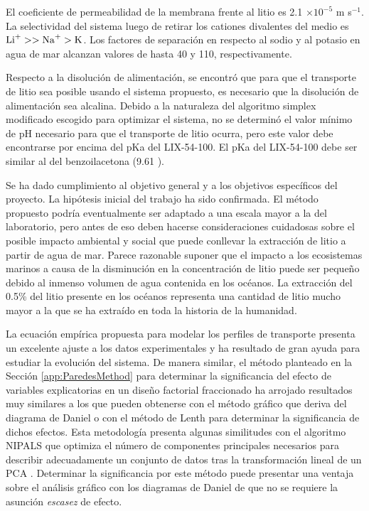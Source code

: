 El coeficiente de permeabilidad de la membrana frente al litio es 2.1 $\times10^{-5}$ m s$^{-1}$. La selectividad del sistema luego de retirar los cationes divalentes del medio es $\ce{Li+}>>\ce{Na+}>\ce{K}$. Los factores de separación en respecto al sodio y al potasio en agua de mar alcanzan valores de hasta 40 y 110, respectivamente. 

Respecto a la disolución de alimentación, se encontró que para que el transporte de litio sea posible usando el sistema propuesto, es necesario que la disolución de alimentación sea alcalina. Debido a la naturaleza del algoritmo simplex modificado escogido para optimizar el sistema, no se determinó el valor mínimo de pH necesario para que el transporte de litio ocurra, pero este valor debe encontrarse por encima del pKa del LIX-54-100. El pKa del LIX-54-100 debe ser similar al del benzoilacetona (9.61 \citep{Witt2017}). 

Se ha dado cumplimiento al objetivo general y a los objetivos específicos del proyecto. La hipótesis inicial del trabajo ha sido confirmada. El método propuesto podría eventualmente ser adaptado a una escala mayor a la del laboratorio, pero antes de eso deben hacerse consideraciones cuidadosas sobre el posible impacto ambiental y social que puede conllevar la extracción de litio a partir de agua de mar. Parece razonable suponer que el impacto a los ecosistemas marinos a causa de la disminución en la concentración de litio puede ser pequeño debido al inmenso volumen de agua contenida en los océanos. La extracción del 0.5\% del litio presente en los océanos representa una cantidad de litio mucho mayor a la que se ha extraído en toda la historia de la humanidad.

La ecuación empírica propuesta para modelar los perfiles de transporte presenta un excelente ajuste a los datos experimentales y ha resultado de gran ayuda para estudiar la evolución del sistema. De manera similar, el método planteado en la Sección \ref{app:ParedesMethod} para determinar la significancia del efecto de variables explicatorias en un diseño factorial fraccionado ha arrojado resultados muy similares a los que pueden obtenerse con el método gráfico que deriva del dia\-grama de Daniel o con el método de Lenth para determinar la significancia de dichos efectos. Esta metodología presenta algunas similitudes con el algoritmo \ac{NIPALS} que optimiza el número de componentes principales necesarios para describir adecuadamente un conjunto de datos tras la transformación lineal de un \ac{PCA} \citep{Wehrens2011}. Determinar la significancia por este método puede presentar una ventaja sobre el análisis gráfico con los diagramas de Daniel de que no se requiere la asunción \textit{escasez} de efecto.


